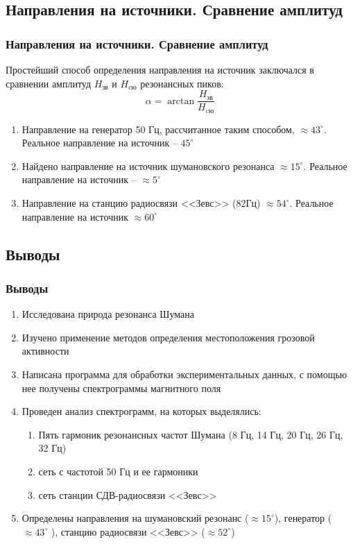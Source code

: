 \documentclass[10pt,pdf,hyperref={unicode}, dvipsnames]{beamer}
\newcommand\frametitless[1]{\subsection{#1}\frametitle{#1}}
\begin{document}
\begin{frame}[c]
	\frametitless{Направления на источники. Сравнение амплитуд}
	Простейший способ определения направления на источник заключался в сравнении амплитуд $H_{\text{зв}}$ и $H_{\text{cю}}$ резонансных пиков:
	\begin{equation*}
		\alpha=\arctan{\frac{H_{\text{зв}}}{H_{\text{cю}}}}
	\end{equation*}
	\begin{enumerate}
		\item Направление на генератор 50 Гц, рассчитанное таким способом, $\approx43^\circ$. Реальное направление на источник -- $45^\circ$
		\item Найдено направление на источник шумановского резонанса $\approx15^\circ$. Реальное направление на источник -- $\approx 5^\circ$
		\item Направление на станцию радиосвязи <<Зевс>> (82Гц) $\approx54^\circ$. Реальное направление на источник  $\approx60^\circ$
	\end{enumerate}
\end{frame}
\begin{frame}
	\frametitless{Выводы}
	\begin{enumerate}
		\item Исследована природа резонанса Шумана
		\item Изучено применение методов определения местоположения грозовой активности
		\item Написана программа для обработки экспериментальных данных, с помощью нее получены спектрограммы магнитного поля
		\item Проведен анализ спектрограмм, на которых выделялись:
		\begin{enumerate}
		 \item Пять гармоник резонансных частот Шумана (8 Гц, 14 Гц, 20 Гц, 26 Гц, 32 Гц)
		 \item сеть с частотой 50 Гц и ее гармоники
		 \item сеть станции СДВ-радиосвязи  <<Зевс>>
		  \end{enumerate}
		\item Определены направления на шумановский резонанс ($\approx15^\circ$), генератор ($\approx43^\circ$ ), станцию радиосвязи <<Зевс>> ($\approx52^\circ$) 
	\end{enumerate}
\end{frame}
\end{document}
